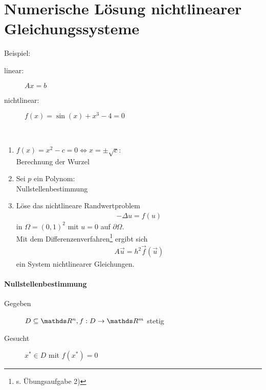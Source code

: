% 
% 
% 
% 


\chapter{Numerische Lösung nichtlinearer Gleichungssysteme}
Beispiel:
\begin{description}
\item[linear:] $Ax=b$
\item[nichtlinear:] $f(x) = \sin(x) +x^3-4=0$
\end{description}



\begin{Bspe}~
  \begin{enumerate}[1)]
  \item $f(x) = x^2-c = 0 \Leftrightarrow x= \pm \sqrt{c}$: \\Berechnung der Wurzel
  \item Sei $p$ ein Polynom:\\ Nullstellenbestimmung
  \item Löse das nichtlineare Randwertproblem
    \begin{gather*}
      -\Delta u = f(u)
    \end{gather*}
    in $\Omega=(0,1)^2$ mit $u=0$ auf $\partial \Omega$. \\
    Mit dem Differenzenverfahren\footnote{s. Übungsaufgabe 2)}
    ergibt sich
    \begin{gather*}
      A\vec{u} = h^2 \vec{f}(\vec{u})
    \end{gather*}
    ein System nichtlinearer Gleichungen.
  \end{enumerate}
\end{Bspe}

\subsubsection{Nullstellenbestimmung}
\begin{description}
\item[Gegeben]   $D\subseteq \R^n, f: D\rightarrow \R^m$ stetig
\item[Gesucht]    $x^{*}\in D $ mit $f(x^{*}) = 0$
\end{description}

